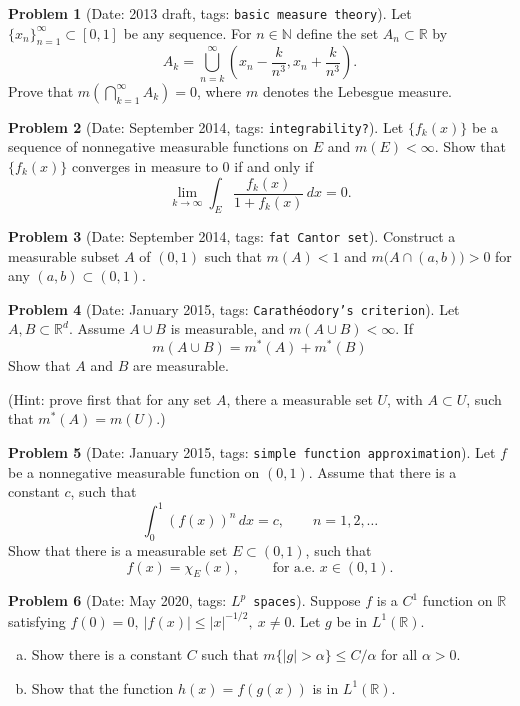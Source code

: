 \documentclass[11pt, notitlepage]{article}
\theoremstyle{definition}
\theoremstyle{definition}
\theoremstyle{definition}
\newtheorem{probstate}{Problem}
\theoremstyle{remark}
\newenvironment{problem}[2]{
    \begin{probstate}[Date: #1, tags: {\color{white} \texttt{#2}}]
}
{
  \end{probstate}
}
\newcommand{\R}{\mathbb{R}}
\newcommand{\N}{\mathbb{N}}
\begin{document}
\begin{problem}{2013 draft}{basic measure theory}
Let $\{x_n\}_{n=1}^{\infty} \subset [0,1]$ be any sequence. For $n \in \N$ define the set $A_n \subset \R$ by
  \[
   A_k=\bigcup_{n=k}^{\infty} \left(x_n-\frac{k}{n^3}, x_n+ \frac{k}{n^3} \right).
  \]
  Prove that $m(\bigcap_{k=1}^{\infty} A_k)=0$, where $m$ denotes the Lebesgue measure.
\end{problem}


\begin{problem}{September 2014}{integrability?}
Let $\{f_k(x)\}$ be a sequence of nonnegative measurable functions on $E$ and $m(E)<\infty$. Show that $\{f_k(x)\}$ converges in measure to $0$ if and only if
$$\lim_{k\to\infty}\int_E\frac{f_k(x)}{1+f_k(x)}\,dx=0.$$
\end{problem}


\begin{problem}{September 2014}{fat Cantor set}
Construct a measurable subset $A$ of $(0,1)$ such that $m(A)<1$ and
 $m \big(A \cap (a,b) \big) >0$ for any $(a,b) \subset (0,1)$.
\end{problem}

\begin{problem}{January 2015}{Carath\'eodory's criterion}
Let $A, B\subset \mathbb R^d$. Assume $A\cup B$ is measurable, and $m(A\cup B)<\infty$. If
$$m(A\cup B)=m^*(A)+m^*(B)$$
Show that $A$ and $B$ are measurable.

(Hint: prove first that for any set $A$, there a measurable set $U$, with $A\subset U$, such that $m^*(A)=m(U)$.)
\end{problem}

\begin{problem}{January 2015}{simple function approximation}
Let $f$ be a nonnegative measurable function on $(0,1)$. Assume that there is a constant $c$, such that
$$\int_0^1 (f(x))^n\,dx=c,\qquad n=1,2,\dots$$
Show that there is a measurable set $E\subset (0,1)$, such that
$$f(x)=\chi_E(x),\qquad \text{ for a.e. }  x\in(0,1).$$
\end{problem}

\begin{problem}{May 2020}{$L^p$ spaces}
Suppose $f$ is a $C^1$ function on $\mathbb{R}$ satisfying $f(0)=0, \ |f(x)|\le |x|^{-1/2}, \ x\ne 0$. Let $g$ be in  $L^1(\mathbb{R})$.
\begin{enumerate}[(a)]
\item Show there is a constant $C$ such that $m\{|g|>\alpha\}\le C/\alpha$ for all $\alpha>0$.
\item Show that the function $h(x)=f(g(x))$ is in $L^1(\mathbb{R})$.
\end{enumerate}
\end{problem}
\end{document}

